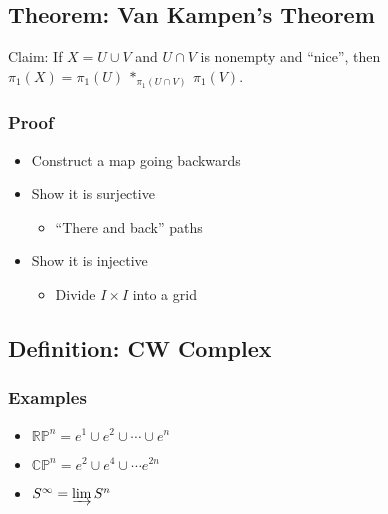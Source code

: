 \hypertarget{theorem-van-kampens-theorem}{%
\subsection{Theorem: Van Kampen's
Theorem}\label{theorem-van-kampens-theorem}}

Claim: If \(X = U \cup V\) and \(U \cap V\) is nonempty and ``nice'',
then \(\pi_1(X) = \pi_1(U) ~\ast_{\pi_1(U \cap V)}~ \pi_1(V)\).

\hypertarget{proof-1}{%
\subsubsection{Proof}\label{proof-1}}

\begin{itemize}
\tightlist
\item
  Construct a map going backwards
\item
  Show it is surjective

  \begin{itemize}
  \tightlist
  \item
    ``There and back'' paths
  \end{itemize}
\item
  Show it is injective

  \begin{itemize}
  \tightlist
  \item
    Divide \(I\times I\) into a grid
  \end{itemize}
\end{itemize}

\hypertarget{definition-cw-complex}{%
\subsection{Definition: CW Complex}\label{definition-cw-complex}}

\hypertarget{examples-1}{%
\subsubsection{Examples}\label{examples-1}}

\begin{itemize}
\tightlist
\item
  \(\mathbb{RP}^n = e^1 \cup e^2 \cup \cdots \cup e^n\)
\item
  \(\mathbb{CP}^n =e^2 \cup e^4 \cup \cdots e^{2n}\)
\item
  \(S^\infty = \varinjlim S^n\)
\end{itemize}


